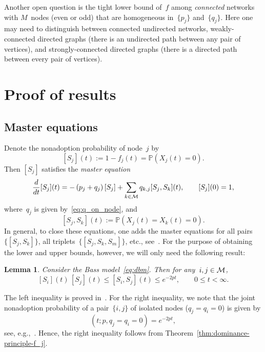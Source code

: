 \documentclass[review]{elsarticle}
\newtheorem{lemma}{Lemma}
\begin{document}
 Another open question is the tight lower bound of~$f$ among {\em connected}
networks with $M$~nodes (even or odd) that are homogeneous in~$\{p_j\}$ and~$\{q_j\}$.
Here one may need to distinguish between connected undirected networks, 
 weakly-connected directed graphs (there is an undirected path between any pair of vertices), and strongly-connected directed graphs (there is a directed path between every pair of vertices).




\section{Proof of results}
\label{sec:proofs}


\subsection{Master equations}

Denote the nonadoption probability of node~$j$ by
\begin{equation}
\label{eq:nonadoption_prob}
[S_j](t):=1-f_j(t)= \mathbb{P}(X_j(t)=0).
\end{equation}
Then $[S_j]$ satisfies
 the {\em master equation}~\citep{fibich2022diffusion}
	\begin{equation}
		\label{eq:master_Sa}
		\frac{d}{dt}[S_j](t)= -\left(p_j+q_j\right)\left[S_{j}\right]
		+\sum_{\substack{k \in {\cal M}}}q_{k,j}[S_j,S_k](t), \qquad [S_{j}](0) =1,
	\end{equation} 
where~$q_j$ is given by~\eqref{eq:q_on_node}, and
$$
[S_j,S_k](t):=\mathbb{P}(X_j(t)=X_k(t)=0).
$$
In general, to close these equations, one adds the master equations for all pairs~$\{[S_j, S_k]\}$, all triplets~$\{[S_j, S_k, S_m]\}$, etc., see~\cite{fibich2022diffusion}. For the purpose of obtaining the lower and upper bounds, however, we will only need the following result:
\begin{lemma}
Consider the  Bass model~\eqref{eq:dbm}. Then for any~$i,j \in {\cal M}$,
\begin{equation}
\label{eq:set_e-2pt}
[S_i](t)\,[S_j](t) \leq [S_i,S_j](t) \leq e^{-2pt}, \qquad 0\leq t<\infty.
\end{equation}
\end{lemma}
\begin{pf}
The left inequality is proved in~\cite{Funnel2022}. For the right inequality, we note that the joint nonadoption probability of a pair~$\{i,j\}$ of isolated nodes ($q_{j} = q_{i} = 0$) is given by
		\begin{equation*}
			[S_i,S_j](t;p,q_{j} = q_{i} = 0) = e^{-2pt}, 
		\end{equation*}
see, e.g.,~\cite{Bass-boundary-18}. Hence, the right inequality follows from Theorem~\ref{thm:dominance-principle-f_j}.
\end{pf}
\end{document}
